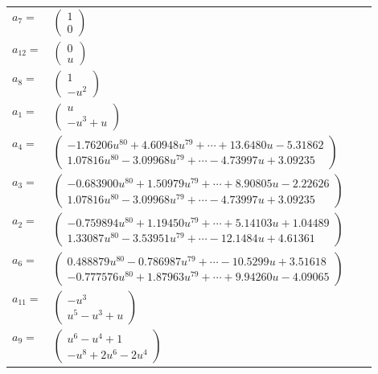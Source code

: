 \documentclass[1p]{elsarticle_modified}
\theoremstyle{definition}
\begin{document}
\begin{tabular}{m{7pt} m{180pt} m{7pt} m{180pt} }
\flushright $a_{7}=$&$\begin{pmatrix}1\\0\end{pmatrix}$ \\
\flushright $a_{12}=$&$\begin{pmatrix}0\\u\end{pmatrix}$ \\
\flushright $a_{8}=$&$\begin{pmatrix}1\\- u^2\end{pmatrix}$ \\
\flushright $a_{1}=$&$\begin{pmatrix}u\\- u^3+u\end{pmatrix}$ \\
\flushright $a_{4}=$&$\begin{pmatrix}-1.76206 u^{80}+4.60948 u^{79}+\cdots+13.6480 u-5.31862\\1.07816 u^{80}-3.09968 u^{79}+\cdots-4.73997 u+3.09235\end{pmatrix}$ \\
\flushright $a_{3}=$&$\begin{pmatrix}-0.683900 u^{80}+1.50979 u^{79}+\cdots+8.90805 u-2.22626\\1.07816 u^{80}-3.09968 u^{79}+\cdots-4.73997 u+3.09235\end{pmatrix}$ \\
\flushright $a_{2}=$&$\begin{pmatrix}-0.759894 u^{80}+1.19450 u^{79}+\cdots+5.14103 u+1.04489\\1.33087 u^{80}-3.53951 u^{79}+\cdots-12.1484 u+4.61361\end{pmatrix}$ \\
\flushright $a_{6}=$&$\begin{pmatrix}0.488879 u^{80}-0.786987 u^{79}+\cdots-10.5299 u+3.51618\\-0.777576 u^{80}+1.87963 u^{79}+\cdots+9.94260 u-4.09065\end{pmatrix}$ \\
\flushright $a_{11}=$&$\begin{pmatrix}- u^3\\u^5- u^3+u\end{pmatrix}$ \\
\flushright $a_{9}=$&$\begin{pmatrix}u^6- u^4+1\\- u^8+2 u^6-2 u^4\end{pmatrix}$ \\

\end{tabular}
\end{document}
